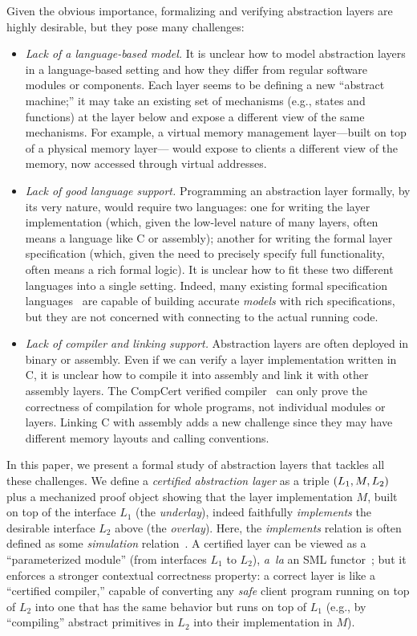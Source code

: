 {Given the obvious importance, formalizing and verifying abstraction 
layers are highly desirable, but they pose many challenges:
\begin{itemize} \itemsep 0pt
\item
{\em Lack of a language-based model.}  It is unclear how to
  model abstraction layers in a language-based setting and how they
  differ from regular software modules or components.  Each layer
  seems to be defining a new ``abstract machine;'' it may take an
  existing set of mechanisms (e.g., states and functions) at the layer
  below and expose a different view of the same mechanisms. For
  example, a virtual memory management layer---built on top of a
  physical memory layer--- would expose to clients a different view of
  the memory, now accessed through virtual addresses.
\item {\em Lack of good language support.} Programming an abstraction
  layer formally, by its very nature, would require two languages: one
  for writing the layer implementation (which, given the low-level
  nature of many layers, often means a language like C or assembly);
  another for writing the formal layer specification (which, given the
  need to precisely specify full functionality, often means a rich
  formal logic). It is unclear how to fit these two different
  languages into a single setting. Indeed, many existing formal
  specification languages~\cite{znot92,lamport94,jackson12} are
  capable of building accurate {\em models} with rich specifications,
  but they are not concerned with connecting to the actual running code.
\item {\em Lack of compiler and linking support.} Abstraction layers
  are often deployed in binary or assembly. Even if we can verify a
  layer implementation written in C, it is unclear how to compile it
  into assembly and link it with other assembly layers. The CompCert
  verified compiler~\cite{compcert} can only prove the correctness of
  compilation for whole programs, not individual modules or
  layers. Linking C with assembly adds a new challenge since they may
  have different memory layouts and calling conventions.
\end{itemize}

In this paper, we present a formal study of abstraction layers that
tackles all these challenges. We define a {\em certified abstraction
  layer} as a triple $(L_1,M,L_2)$ plus a mechanized proof
object showing that the layer implementation $M$, built on top of the
interface $L_1$ (the {\em underlay}), indeed faithfully {\em
  implements} the desirable interface $L_2$ above (the {\em overlay}).
Here, the {\em implements} relation is often defined as some
{\em simulation} relation~\cite{Lynch95}.  A certified layer can be
viewed as a ``parameterized module'' (from interfaces $L_1$ to $L_2$),
{\em a~la} an SML functor~\cite{milner97}; but it enforces a stronger
contextual correctness property: a correct layer is like a
``certified compiler,'' capable of converting any {\em safe} client program
running on top of $L_2$ into one that has the same behavior but runs
on top of $L_1$ (e.g., by ``compiling'' abstract primitives in $L_2$ into
their implementation in $M$). 

}
